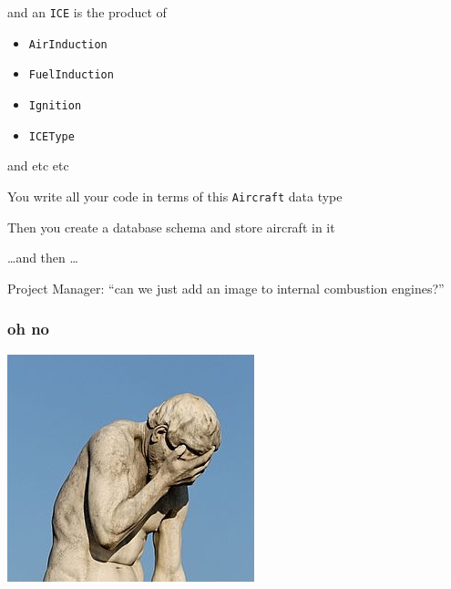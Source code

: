 \begin{frame}
\begin{center}
and an \lstinline{ICE} is the product of
\end{center}
\begin{itemize}
\item \lstinline{AirInduction}
\item \lstinline{FuelInduction}
\item \lstinline{Ignition}
\item \lstinline{ICEType}
\end{itemize}
\end{frame}

\begin{frame}
\begin{center}
and etc etc
\end{center}
\end{frame}

\begin{frame}
\begin{center}
You write all your code in terms of this \lstinline{Aircraft} data type
\end{center}
\end{frame}

\begin{frame}
\begin{center}
Then you create a database schema and store aircraft in it
\end{center}
\end{frame}

\begin{frame}
\begin{center}
\ldots and then \ldots
\end{center}
\end{frame}

\begin{frame}
\begin{center}
Project Manager: ``can we just add an image to internal combustion engines?''
\end{center}
\end{frame}

\begin{frame}[fragile]
\frametitle{oh no}
\begin{center}
\includegraphics[height=0.24\textheight]{image/ohno.jpg}
\end{center}
\end{frame}

